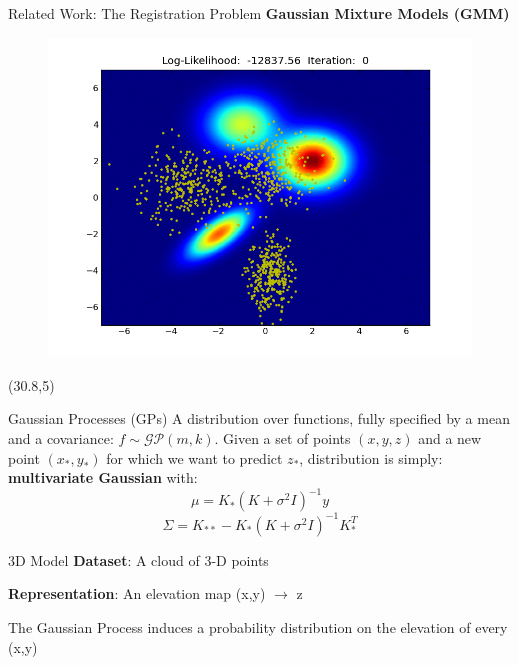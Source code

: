 \documentclass[final]{beamer}
\begin{document}
\begin{frame}{}
\begin{textblock}{27}
\begin{block}{Related Work: The Registration Problem}
{\bf Gaussian Mixture Models (GMM)}
\begin{figure}
\includegraphics[width=10in]{register2D.png}
\end{figure}

\end{block}
\end{textblock}

\begin{textblock}{27.5}(30.8,5)
\begin{block}{Gaussian Processes (GPs)}
A distribution over functions, fully specified by a mean and a covariance:
$f \sim \mathcal{GP}(m,k)$. Given a set of points $(x,y,z)$ and a new point $(x_*,y_*)$ for which we want to predict $z_*$, 
distribution is simply: {\bf multivariate Gaussian} with:
$$\mu = K_* (K + \sigma^2 I)^{-1}y$$
$$\Sigma = K_{**} - K_* (K + \sigma^2 I)^{-1} K_*^T$$
\end{block}

\begin{block}{3D Model}
{\bf Dataset}: A cloud of 3-D points

{\bf Representation}: An elevation map (x,y) $\rightarrow$ z

The Gaussian Process induces a probability distribution on the elevation of every (x,y)


\end{block}
\end{textblock}
\end{frame}
\end{document}
